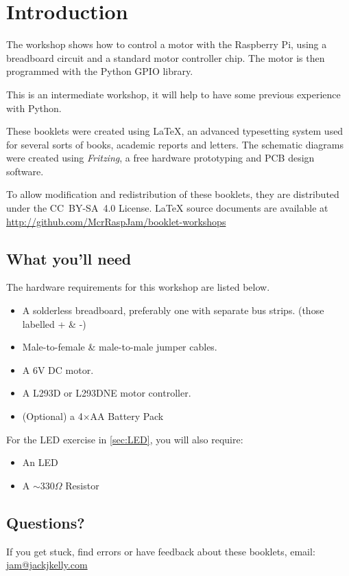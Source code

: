 \setcounter{section}{-1}
\section{Introduction}
	
	
	The workshop shows how to control a motor with the Raspberry Pi, using a breadboard circuit and a standard motor controller chip. The motor is then programmed with the Python GPIO library.

	This is an intermediate workshop, it will help to have some previous experience with Python.
		
	These booklets were created using {\selectfont \LaTeX}, an advanced typesetting system used for several sorts of books, academic reports and letters. The schematic diagrams were created using \textit{Fritzing}, a free hardware prototyping and PCB design software.
		
	To allow modification and redistribution of these booklets, they are distributed under the \hbox{CC BY-SA 4.0} License. LaTeX source documents are available at \url{http://github.com/McrRaspJam/booklet-workshops}
	
	
	\subsection*{What you'll need}
		
			
		The hardware requirements for this workshop are listed below.
	
		\begin{itemize}[nosep]		
			\item A solderless breadboard, preferably one with separate bus strips. (those labelled + \& -)
			\item Male-to-female \& male-to-male jumper cables.
			\item A 6V DC motor.
			\item A L293D or L293DNE motor controller.
			\item (Optional) a 4$\times$AA Battery Pack				
		\end{itemize}

		For the LED exercise in \autoref{sec:LED}, you will also require:
			
		\begin{itemize}[nosep]	
			\item An LED
			\item A $\sim 330 \Omega$ Resistor
		\end{itemize}	
			
	
		
	\subsection*{Questions?}
		If you get stuck, find errors or have feedback about these booklets, email:
		\url{jam@jackjkelly.com}\label{email}